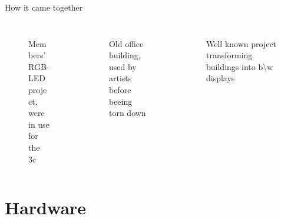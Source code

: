 \documentclass{beamer}
\begin{document}
\begin{frame}{How it came together}
\begin{columns}
\begin{column}{3.5cm}
\begin{figure}
\begin{center}
          \end{center}
        \end{figure}
\end{column}
\end{columns}
\begin{columns}[T]
\begin{column}{3.5cm}
        \begin{figure}
          \begin{center}
          Members' RGB-LED project, \\were in use for the 3c
          \end{center}
        \end{figure}
 
\end{column}
\begin{column}{3.5cm}
        \begin{figure}
          \begin{center}
          Old office building,\\used by artists before beeing torn down
          \end{center}
        \end{figure}
 
\end{column}
\begin{column}{3.5cm}
        \begin{figure}
          \begin{center}
          Well known project transforming buildings into b\textbackslash w displays
          \end{center}
        \end{figure}
 
    \end{column}
\end{columns}
\end{frame}
\section{Hardware}
\end{document}
